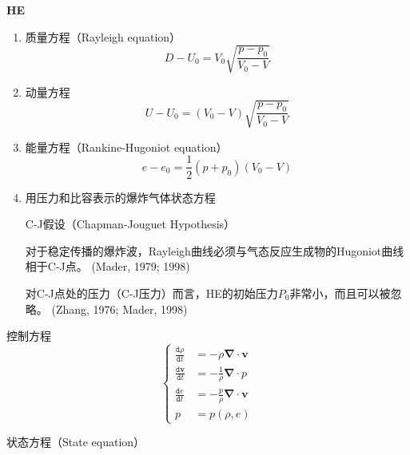 \documentclass{article}
\begin{document}
\captionsetup{labelformat=default,labelsep=space}
\begin{center}\Huge\bfseries
    HE
\end{center}
\begin{enumerate}[label=(\arabic*)]
    \item 质量方程（Rayleigh equation）
    \begin{equation}
        \label{eq6.1}
        \tag{6.1}
        D-U_0 = V_0 \sqrt{\frac{p-p_0}{V_0-V}}
    \end{equation}
    \item 动量方程
    \begin{equation}
        \label{eq6.2}
        \tag{6.2}
        U-U_0=(V_0-V)\sqrt{\frac{p-p_0}{V_0-V}}
    \end{equation}
    \item 能量方程（Rankine-Hugoniot equation）
    \begin{equation}
        \label{eq6.3}
        \tag{6.3}
        e-e_0 = \frac{1}{2} (p+p_0) (V_0-V)
    \end{equation}
    \item 用压力和比容表示的爆炸气体状态方程\par
    \begin{center}
        C-J假设（Chapman-Jouguet Hypothesis）
    \end{center}
    对于稳定传播的爆炸波，Rayleigh曲线必须与气态反应生成物的Hugoniot曲线相于C-J点。
    (Mader, 1979; 1998) \par
    对C-J点处的压力（C-J压力）而言，HE的初始压力$P_0$非常小，而且可以被忽略。
    (Zhang, 1976; Mader, 1998)
\end{enumerate}

控制方程
\begin{equation}
    \label{eq6.4}
    \tag{6.4}
    \left\{
    \begin{aligned}
        \frac{\texttt{d} \rho}{\texttt{d} t} &= -\rho \bm{\nabla} \cdot \bm{v} \\
        \frac{\texttt{d} \bm{v}}{\texttt{d} t} &= -\frac{1}{\rho} \bm{\nabla} \cdot p \\
        \frac{\texttt{d} e}{\texttt{d} t} &= -\frac{p}{\rho} \bm{\nabla} \cdot \bm{v} \\
        p &= p(\rho, e)
    \end{aligned}
    \right.
\end{equation}

状态方程（State equation）
\end{document}

